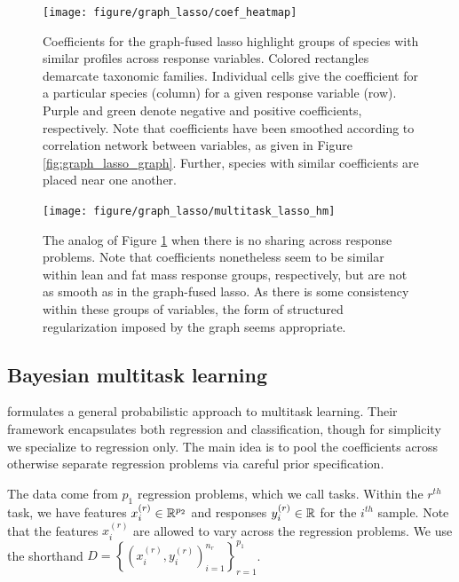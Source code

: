\documentclass{article}
\begin{document}
\begin{figure}
  \centering
  \texttt{[image: figure/graph\_lasso/coef\_heatmap]}
  \caption{Coefficients for the graph-fused lasso highlight groups of species
    with similar profiles across response variables. Colored rectangles
    demarcate taxonomic families. Individual cells give the coefficient for a
    particular species (column) for a given response variable (row). Purple and
    green denote negative and positive coefficients, respectively. Note that
    coefficients have been smoothed according to correlation network between
    variables, as given in Figure \ref{fig:graph_lasso_graph}. Further, species
    with similar coefficients are placed near one
    another. \label{fig:graph_lasso_coef_heatmap} }
\end{figure}

\begin{figure}
  \centering
  \texttt{[image: figure/graph\_lasso/multitask\_lasso\_hm]}
  \caption{The analog of Figure \ref{fig:graph_lasso_coef_heatmap} when there is
    no sharing across response problems. Note that coefficients nonetheless seem
    to be similar within lean and fat mass response groups, respectively, but
    are not as smooth as in the graph-fused lasso. As there is some consistency
    within these groups of variables, the form of structured regularization
    imposed by the graph seems
    appropriate. \label{fig:graph_lasso_multitask_lasso_hm} }
\end{figure}

\subsection{Bayesian multitask learning}
\label{subsec:bayesian_multitask}

\cite{zhang2005learning} formulates a general probabilistic approach to
multitask learning. Their framework encapsulates both regression and
classification, though for simplicity we specialize to regression only. The main
idea is to pool the coefficients across otherwise separate regression problems
via careful prior specification.

The data come from $p_{1}$ regression problems, which we call tasks. Within the
$r^{th}$ task, we have features $x_{i}^{(r)} \in \mathbb{R}^{p_{2}}$ and responses
$y_{i}^{(r)} \in \mathbb{R}$ for the $i^{th}$ sample. Note that the features
$x_{i}^{(r)}$ are allowed to vary across the regression problems. We use the
shorthand $D = \left\{\left(x_{i}^{(r)}, y_i^{(r)}\right)_{i =
  1}^{n_{r}}\right\}_{r = 1}^{p_{1}}$.
\end{document}
